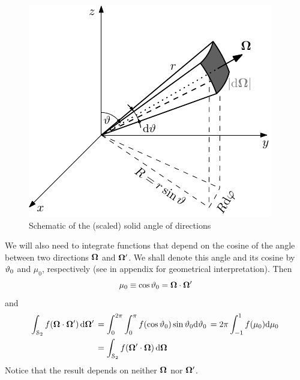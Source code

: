 \begin{figure}[!hbt]
    \centering
    \includegraphics[scale=1.275]{element}
    \caption[Solid angle]{Schematic of the (scaled) solid angle of directions}
    \label{fig:element}
\end{figure}
We will also need to integrate functions that depend on the cosine of the angle between two 
directions $\bomega$ and $\bomega'$. We shall denote this angle and its cosine by $\polar_0$ and $\mu_0$, respectively
(see  in appendix for geometrical interpretation).
Then
$$
	\mu_0 \equiv \cos \polar_0 = \bomega\cdot\bomega'
$$
and
\begin{equation}\label{eq:invint}
\begin{aligned}
	\intA[']{f(\bomega\cdot\bomega')} &= \int_{0}^{2\pi} \int_{0}^{\pi}
		f(\cos \polar_0) \sin \polar_0\d{\polar_0} = 2\pi \muint[_0]{f(\mu_0)}\\
		&= \intA{f(\bomega'\cdot\bomega)}
\end{aligned}
\end{equation}
Notice that the result depends on neither $\bomega$ nor $\bomega'$.

